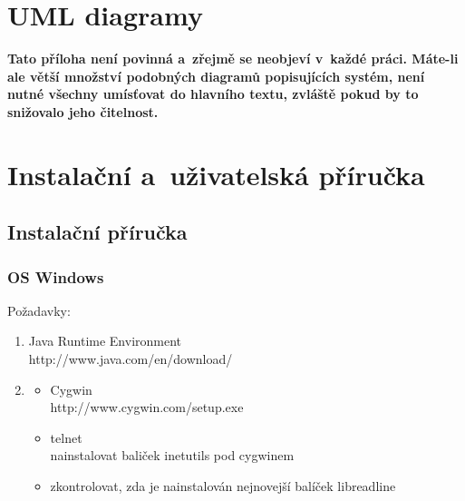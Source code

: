 \documentclass[11pt,twoside,a4paper]{book}
\begin{document}
\chapter{UML diagramy}
\textbf{\large Tato příloha není povinná a~zřejmě se neobjeví v~každé práci. Máte-li ale větší množství podobných
diagramů popisujících systém, není nutné všechny umísťovat do hlavního textu, zvláště pokud by to snižovalo jeho
čitelnost.}

\chapter{Instalační a~uživatelská příručka}

\section{Instalační příručka}

\subsection{OS Windows}
Požadavky:
\begin{enumerate}
 \item Java Runtime Environment\\
      http://www.java.com/en/download/

 \item
       \begin{itemize}
        \item Cygwin\\
    http://www.cygwin.com/setup.exe
	\item telnet\\
    nainstalovat baliček inetutils pod cygwinem
	\item zkontrolovat, zda je nainstalován nejnovejší balíček libreadline
       \end{itemize}


\end{enumerate}


\end{document}
